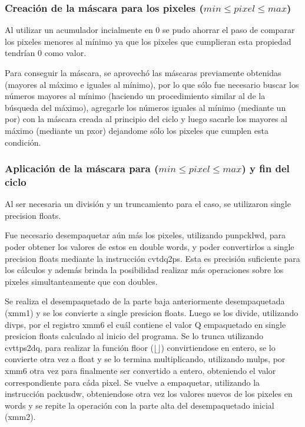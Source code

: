 \subsubsection{Creación de la máscara para los pixeles ($min \leq pixel \leq max$)}
Al utilizar un acumulador incialmente en 0 se pudo ahorrar el paso de comparar los pixeles menores al mínimo ya que los pixeles que cumplieran esta propiedad tendrían 0 como valor.

Para conseguir la máscara, se aprovechó las máscaras previamente obtenidas (mayores al máximo e iguales al mínimo), por lo que sólo fue necesario buscar los números mayores al mínimo (haciendo un procedimiento similar al de la búsqueda del máximo), agregarle los números iguales al mínimo (mediante un por) con la máscara creada al principio del ciclo y luego sacarle los mayores al máximo (mediante un pxor) dejandome sólo los pixeles que cumplen esta condición.

\subsubsection{Aplicación de la máscara para ($min \leq pixel \leq max$) y fin del ciclo}
Al ser necesaria un división y un truncamiento para el caso, se utilizaron single precision floats.

Fue necesario desempaquetar aún más los pixeles, utilizando punpcklwd, para poder obtener los valores de estos en double words, y poder convertirlos a single precision floats mediante la instrucción cvtdq2ps. Esta es precisión suficiente para los cálculos y además brinda la posibilidad realizar más operaciones sobre los pixeles simultanteamente que con doubles.

Se realiza el desempaquetado de la parte baja anteriormente desempaquetada (xmm1) y se los convierte a single presicion floats. Luego se los divide, utilizando divps, por el registro xmm6 el cuál contiene el valor Q empaquetado en single presicion floats calculado al inicio del programa. Se lo trunca utilizando cvttps2dq, para realizar la función floor ($\lfloor \rfloor$) convirtiendose en entero, se lo convierte otra vez a float y se lo termina multiplicando, utilizando mulps, por xmm6 otra vez para finalmente ser convertido a entero, obteniendo el valor correspondiente para cáda pixel. Se vuelve a empaquetar, utilizando la instrucción packusdw, obteniendose otra vez los valores nuevos de los pixeles en words y se repite la operación con la parte alta del desempaquetado inicial (xmm2).

